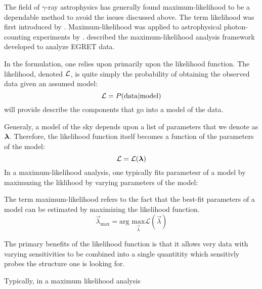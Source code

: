 
The field of $\gamma$-ray astrophysics has generally
found maximum-likelihood to be a dependable method to
avoid the issues discussed above.  The term likelihood was
first introduced by \cite{fisher_1925_statistical-methods}.
Maximum-likelihood was applied to astrophysical photon-counting
experiments by \cite{cash_1979_parameter-estimation}.
\cite{mattox_1996_likelihood-analysis} described the maximum-likelihood
analysis framework developed to analyze \ac{EGRET} data.

In the formulation, one relies upon primarily upon the likelihood
function.  The likelihood, denoted $\mathcal{L}$, is quite simply the
probability of obtaining the observed data given an assumed model:
\begin{equation}
  \mathcal{L} = P(\text{data}|\text{model})
\end{equation}
 will provide describe the
components that go into a model of the data.

Generaly, a model of the sky depends upon a list
of parameters that we denote as $\boldsymbol{\lambda}$.
Therefore, the likelihood function itself becomes
a function of the parameters of the model:
\begin{equation}
  \mathcal{L} = \mathcal{L}(\boldsymbol{\lambda})
\end{equation}
In a maximum-likelihood analysis, one typically
fits parametesr of a model by maximuzing the liklihood
by varying parameters of the model:

The term maximum-likelihood refers to the fact that
the best-fit parameters of a model can be estimated
by maximizing the likelihood function.
\begin{equation}
\vec{\lambda}_\text{max} = \underset{}{\text{arg }}\underset{\vec{\lambda}}{\text{max}} \mathcal{L}(\vec{\lambda})
\end{equation}

The primary benefits of the likelihood function is that it allows
very data with varying sensitivities to be combined into
a single quantitity which sensitivly probes the structure one is looking for.

Typically, in a maximum likelihood analysis

